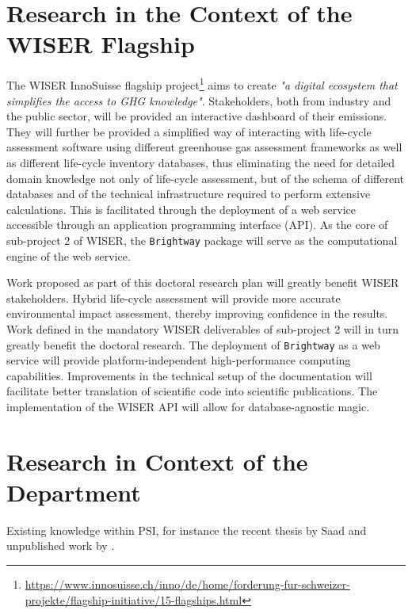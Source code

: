 \documentclass{article}
\begin{document}
\section{Research in the Context of the WISER Flagship}
    
    The WISER InnoSuisse flagship project\footnote{\url{https://www.innosuisse.ch/inno/de/home/forderung-fur-schweizer-projekte/flagship-initiative/15-flagships.html}} aims to create \textit{"a digital ecosystem that simplifies the access to GHG knowledge"}. Stakeholders, both from industry and the public sector, will be provided an interactive dashboard of their emissions. They will further be provided a simplified way of interacting with life-cycle assessment software using different greenhouse gas assessment frameworks as well as different life-cycle inventory databases, thus eliminating the need for detailed domain knowledge not only of life-cycle assessment, but of the schema of different databases and of the technical infrastructure required to perform extensive calculations. This is facilitated through the deployment of a web service accessible through an application programming interface (API). As the core of sub-project 2 of WISER, the \texttt{Brightway} package will serve as the computational engine of the web service.
    
    Work proposed as part of this doctoral research plan will greatly benefit WISER stakeholders. Hybrid life-cycle assessment will provide more accurate environmental impact assessment, thereby improving confidence in the results. Work defined in the mandatory WISER deliverables of sub-project 2 will in turn greatly benefit the doctoral research. The deployment of \texttt{Brightway} as a web service will provide platform-independent high-performance computing capabilities. Improvements in the technical setup of the documentation will facilitate better translation of scientific code into scientific publications. The implementation of the WISER API will allow for database-agnostic magic.
    
\section{Research in Context of the Department}

Existing knowledge within PSI, for instance the recent thesis by Saad \cite{saad_synthetic_2022} and unpublished work by \cite{sacchi_climate-neutral_2022}.
\end{document}

